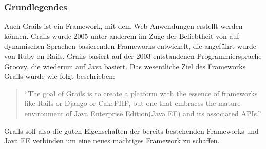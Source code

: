 \subsubsection{Grundlegendes}
Auch Grails ist ein Framework, mit dem Web-Anwendungen erstellt werden können. Grails wurde 2005 unter anderem im Zuge der Beliebtheit von auf dynamischen Sprachen basierenden Frameworks entwickelt, die angeführt wurde von Ruby on Rails. Grails basiert auf der 2003 entstandenen Programmiersprache Groovy, die wiederum auf Java basiert\autocite[S.XXV]{DGG2002}\autocite[S.3]{GGR2009}. Das wesentliche Ziel des Frameworks Grails wurde wie folgt beschrieben: \begin{quote}\small "`The goal of Grails is to create a platform with the essence of frameworks like Rails or Django or CakePHP, but one that embraces the mature environment of Java Enterprise Edition(Java EE) and its associated APIs."'\autocite[S.4]{DGG2002}\end{quote} Grails soll also die guten Eigenschaften der bereits bestehenden Frameworks und Java EE verbinden um eine neues mächtiges Framework zu schaffen.

